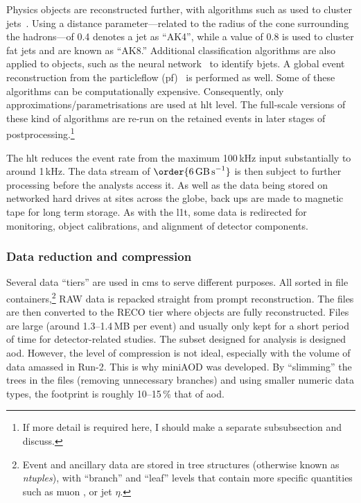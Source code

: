 Physics objects are reconstructed further, with algorithms such as  used to cluster \glspl{jet}~\cite{Cacciari:2008gp}. Using a distance parameter---related to the radius of the cone surrounding the hadrons---of 0.4 denotes a \gls{jet} as ``AK4'', while a value of 0.8 is used to cluster fat jets and are known as ``AK8.'' Additional classification algorithms are also applied to objects, such as the \deepcsv neural network~\cite{Sirunyan:2017ezt} to identify \glspl{bjet}. A global event reconstruction from the \gls{particleflow} (\acrshort{pf})~\cite{CMS-PAS-PFT-09-001,CMS-PRF-14-001} is performed as well. Some of these algorithms can be computationally expensive. Consequently, only approximations/parametrisations are used at \acrshort{hlt} level. The full-scale versions of these kind of algorithms are re-run on the retained events in later stages of postprocessing.\footnote{If more detail is required here, I should make a separate subsubsection and discuss.}

The \acrshort{hlt} reduces the event rate from the maximum 100\,kHz input substantially to around 1\,kHz. The data stream of $\order{\text{6\,GB\,s}^{-1}}$ is then subject to further processing before the analysts access it. As well as the data being stored on networked hard drives at sites across the globe, back ups are made to magnetic tape for long term storage. As with the \acrlong{l1t}, some data is redirected for monitoring, object calibrations, and alignment of detector components.






\subsubsection{Data reduction and compression}
\label{subsubsec:cms_data_tiers}

Several data ``tiers'' are used in \acrshort{cms} to serve different purposes. All sorted in \ROOT file containers,\footnote{Event and ancillary data are stored in tree structures (otherwise known as \emph{ntuples}), with ``branch'' and ``leaf'' levels that contain more specific quantities such as muon \pt, or \gls{jet} $\eta$.} RAW data is repacked straight from prompt reconstruction. The files are then converted to the RECO tier where objects are fully reconstructed. Files are large (around 1.3--1.4\,MB per event) and usually only kept for a short period of time for detector-related studies. The subset designed for analysis is designed \acrfull{aod}. However, the level of compression is not ideal, especially with the volume of data amassed in Run-2. This is why miniAOD was developed. By ``slimming'' the trees in the files (removing unnecessary branches) and using smaller numeric data types, the footprint is roughly 10--15\,\% that of \acrshort{aod}.

